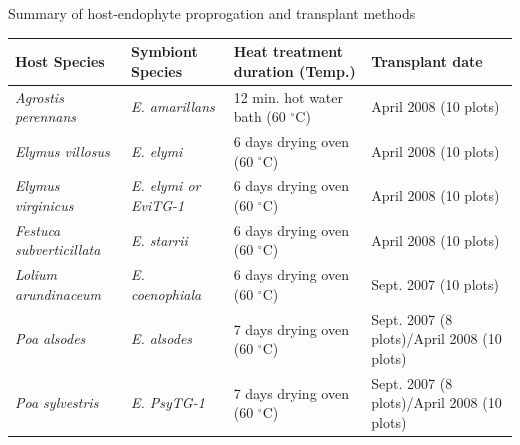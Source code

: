 \documentclass[12pt]{article}
\newcommand{\tom}[2]{{\color{red}{#1}}\footnote{\textit{\color{red}{#2}}}}
\begin{document}
 Summary of host-endophyte proprogation and transplant methods\\
\begin{table}[ht]
	\begin{adjustbox}{width=1\textwidth}
\begin{tabular}{|l|l|l|l|}
\hline
	\bf{Host Species} & \bf{Symbiont Species} & \bf{Heat treatment duration (Temp.)}& \bf{Transplant date }\\
	        \hline
	\emph{Agrostis perennans} & \emph{E. amarillans}&12 min. hot water bath (60 $^{\circ}$C)&April 2008 (10 plots)\\
	\emph{Elymus villosus} &\emph{E. elymi}&6 days drying oven (60 $^{\circ}$C)&April 2008 (10 plots)\\
	\emph{Elymus virginicus} &\emph{E. elymi or EviTG-1}&6 days drying oven (60 $^{\circ}$C)&April 2008 (10 plots)\\
	 \emph{Festuca subverticillata} &\emph{E. starrii}&6 days drying oven (60 $^{\circ}$C)&April 2008 (10 plots)\\
	 \emph{Lolium arundinaceum} &\emph{E. coenophiala}&6 days drying oven (60 $^{\circ}$C)& Sept. 2007 (10 plots)\\
	 \emph{Poa alsodes} &\emph{E. alsodes}& 7 days drying oven (60 $^{\circ}$C)&Sept. 2007 (8 plots)/April 2008 (10 plots)\\
	 \emph{Poa sylvestris}&\emph{E. PsyTG-1}&7 days drying oven (60 $^{\circ}$C)& Sept. 2007 (8 plots)/April 2008 (10 plots)\\
	 \hline
\end{tabular}
\end{adjustbox}
\end{table}


\end{document}
